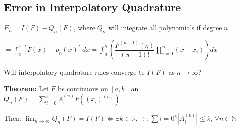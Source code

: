 \documentclass{article}
\begin{document}
\vspace{0.2cm}

\subsection{Error in Interpolatory Quadrature}

$E_n = I(F) - Q_n(F)$, where $Q_n$ will integrate all polynomials if degree $n$

\hspace{0.3cm} $ = \displaystyle \int_a^b [F(x) - p_n (x)] dx = \int_a^b \left( \dfrac{F^{(n + 1)} (\eta)}{(n + 1)!} \prod_{i = 0}^n (x - x_i) \right) dx$

Will interpolatory quadrature rules converge to $I(F)$ as $n \to \infty$?

\textbf{Theorem:} Let $F$ be continuous on $[a, b]$ an $Q_n(F) = \displaystyle \sum_{i = 0}^n A_i^{(n)} F( (x_i)^{(n)})$

Then: $\displaystyle \lim_{n \to \infty} Q_n(F) = I(F) \Longleftrightarrow \exists k \in \mathbb R, \ni: \sum{i = 0}^n |A_i^{(n)}| \leq k$, $\forall n \in \mathbb N$
\end{document}
